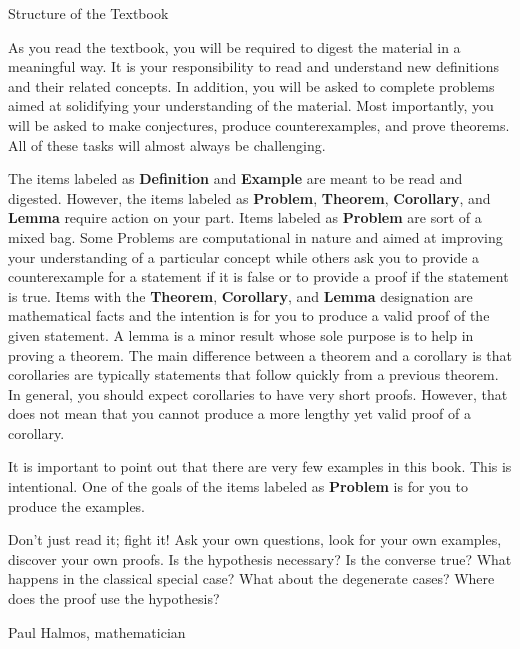 \begin{section}{Structure of the Textbook}

As you read the textbook, you will be required to digest the material in a meaningful way.  It is your responsibility to read and understand new definitions and their related concepts.  
In addition, you will be asked to complete problems aimed at solidifying your understanding of the material.  Most importantly, you will be asked to make conjectures, produce counterexamples, and prove theorems. All of these tasks will almost always be challenging.

The items labeled as \textbf{Definition} and \textbf{Example} are meant to be read and digested.  However, the items labeled as \textbf{Problem}, \textbf{Theorem}, \textbf{Corollary}, and \textbf{Lemma} require action on your part.  Items labeled as \textbf{Problem} are sort of a mixed bag. Some Problems are computational in nature and aimed at improving your understanding of a particular concept while others ask you to provide a counterexample for a statement if it is false or to provide a proof if the statement is true. Items with the \textbf{Theorem}, \textbf{Corollary}, and \textbf{Lemma} designation are mathematical facts and the intention is for you to produce a valid proof of the given statement.  A lemma is a minor result whose sole purpose is to help in proving a theorem. The main difference between a theorem and a corollary is that corollaries are typically statements that follow quickly from a previous theorem.  In general, you should expect corollaries to have very short proofs.  However, that does not mean that you cannot produce a more lengthy yet valid proof of a corollary.

It is important to point out that there are very few examples in this book.  This is intentional.  One of the goals of the items labeled as \textbf{Problem} is for you to produce the examples.

\epigraph{Don't just read it; fight it! Ask your own questions, look for your own examples, discover your own proofs. Is the hypothesis necessary? Is the converse true? What happens in the classical special case? What about the degenerate cases? Where does the proof use the hypothesis?}{Paul Halmos, mathematician}

\end{section}

